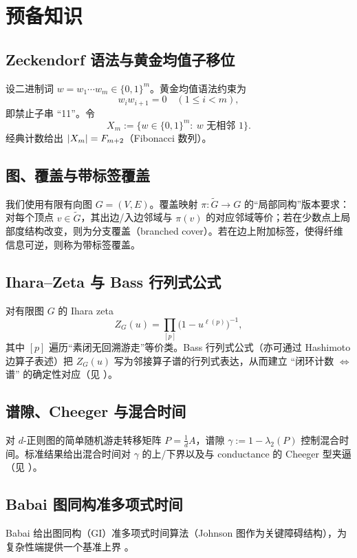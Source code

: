\section{预备知识}\label{sec:prelim}

\subsection{Zeckendorf 语法与黄金均值子移位}
设二进制词 $w=w_1\cdots w_m\in\{0,1\}^m$。黄金均值语法约束为
\[
  w_iw_{i+1}=0 \quad (1\le i<m),
\]
即禁止子串 ``11''。令
\[
  X_m := \{w\in\{0,1\}^m:\ \text{$w$ 无相邻 $1$}\}.
\]
经典计数给出 $\left\lvert X_m\right\rvert=F_{m+2}$（Fibonacci 数列）。

\subsection{图、覆盖与带标签覆盖}
我们使用有限有向图 $G=(V,E)$。覆盖映射 $\pi:\widetilde G\to G$ 的“局部同构”版本要求：对每个顶点 $v\in \widetilde G$，其出边/入边邻域与 $\pi(v)$ 的对应邻域等价；若在少数点上局部度结构改变，则为分支覆盖（branched cover）。若在边上附加标签，使得纤维信息可逆，则称为带标签覆盖。

\subsection{Ihara--Zeta 与 Bass 行列式公式}
对有限图 $G$ 的 Ihara zeta
\[
  Z_G(u)=\prod_{[p]}\bigl(1-u^{\ell(p)}\bigr)^{-1},
\]
其中 $[p]$ 遍历“素闭无回溯游走”等价类。Bass 行列式公式（亦可通过 Hashimoto 边算子表述）把 $Z_G(u)$ 写为邻接算子谱的行列式表达，从而建立 ``闭环计数 $\Leftrightarrow$ 谱'' 的确定性对应（见 \cite{bass1992ihara,ihara1966zeta}）。

\subsection{谱隙、Cheeger 与混合时间}
对 $d$-正则图的简单随机游走转移矩阵 $P=\tfrac1dA$，谱隙 $\gamma:=1-\lambda_2(P)$ 控制混合时间。标准结果给出混合时间对 $\gamma$ 的上/下界以及与 conductance 的 Cheeger 型夹逼（见 \cite{levinpereswilmer,lmspectralsgapnotes}）。

\subsection{Babai 图同构准多项式时间}
Babai 给出图同构（GI）准多项式时间算法（Johnson 图作为关键障碍结构），为复杂性端提供一个基准上界 \cite{babai2016gi}。

